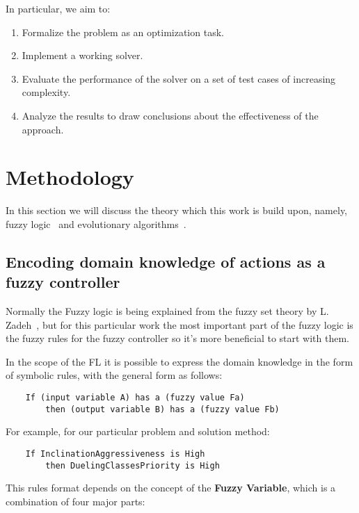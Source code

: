 \documentclass[11pt, a4paper]{article}
\begin{document}
	In particular, we aim to:
	\begin{enumerate}
		\item Formalize the problem as an optimization task.
		\item Implement a working solver.
		\item Evaluate the performance of the solver on a set of test cases of increasing complexity.
		\item Analyze the results to draw conclusions about the effectiveness of the approach.
	\end{enumerate}

	\section{Methodology}\label{methodology}

  In this section we will discuss the theory which this work is build upon, namely, fuzzy logic~\cite{ray2014softcomputing} and evolutionary algorithms~\cite{mitchell1999geneticalgorithms}.

	\subsection{Encoding domain knowledge of actions as a fuzzy controller}

  Normally the Fuzzy logic is being explained from the fuzzy set theory by L. Zadeh~\cite{zadeh1965fuzzy}, but for this particular work the most important part of the fuzzy logic is the fuzzy rules for the fuzzy controller so it's more beneficial to start with them.

  In the scope of the FL it is possible to express the domain knowledge in the form of symbolic rules, with the general form as follows:

  \begin{verbatim}
    If (input variable A) has a (fuzzy value Fa) 
    	then (output variable B) has a (fuzzy value Fb)
  \end{verbatim}

  For example, for our particular problem and solution method:

  \begin{verbatim}
    If InclinationAggressiveness is High 
    	then DuelingClassesPriority is High
  \end{verbatim}

  This rules format depends on the concept of the \textbf{Fuzzy Variable}, which is a combination of four major parts:
\end{document}
